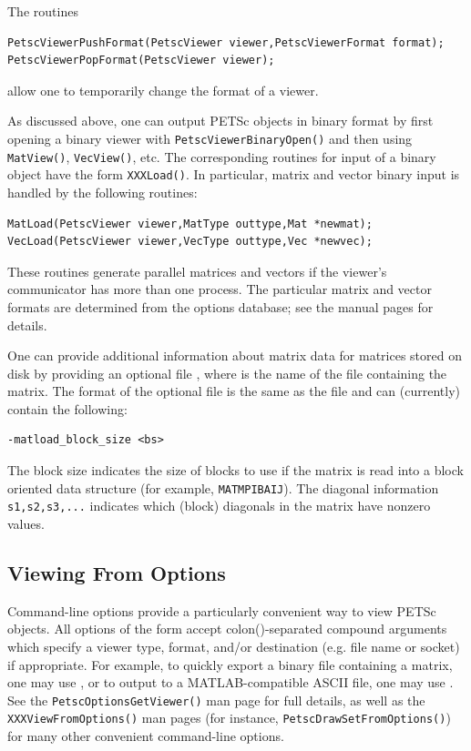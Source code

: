 {{{The routines
\begin{lstlisting}
PetscViewerPushFormat(PetscViewer viewer,PetscViewerFormat format);
PetscViewerPopFormat(PetscViewer viewer);
\end{lstlisting}
allow one to temporarily change the format of a viewer.

As discussed above, one can output PETSc objects in binary format by
first opening a binary viewer with \lstinline{PetscViewerBinaryOpen()} and
then using \lstinline{MatView()}, \lstinline{VecView()}, etc.  The corresponding
routines for input of a binary object have the form \lstinline{XXXLoad()}.  In
particular, matrix and vector binary input is handled by the
following routines:
\begin{lstlisting}
MatLoad(PetscViewer viewer,MatType outtype,Mat *newmat);
VecLoad(PetscViewer viewer,VecType outtype,Vec *newvec);
\end{lstlisting}
These routines generate parallel matrices and vectors if the viewer's
communicator has more than one process.  The particular matrix and
vector formats are determined from the options database; see the
manual pages for details.

One can provide additional information about matrix data for matrices
stored on disk by providing an optional file ,
where  is the name of the file containing the matrix.
The format of the optional file is the same as the  file
and can (currently) contain the following:
\begin{lstlisting}
-matload_block_size <bs>
\end{lstlisting}
The block size indicates the size of blocks to use if the matrix is
read into a block oriented data structure (for example,
\lstinline{MATMPIBAIJ}). The diagonal information
\lstinline{s1,s2,s3,...} indicates
which (block) diagonals in the matrix have nonzero values.

\subsection{Viewing From Options}
\label{sec_viewfromoptions}
Command-line options provide a particularly convenient way to view PETSc objects.
All options of the form  accept colon(\trl{:})-separated compound arguments which
specify a viewer type, format, and/or destination (e.g. file name or socket) if appropriate.
For example, to quickly export a binary file containing a matrix, one may use
, 
or to output to a MATLAB-compatible ASCII file, one may use
.
See the \lstinline{PetscOptionsGetViewer()} man page for full details,
as well as the \lstinline{XXXViewFromOptions()} man pages (for instance, \lstinline{PetscDrawSetFromOptions()})
for many other convenient command-line options.

}}}
